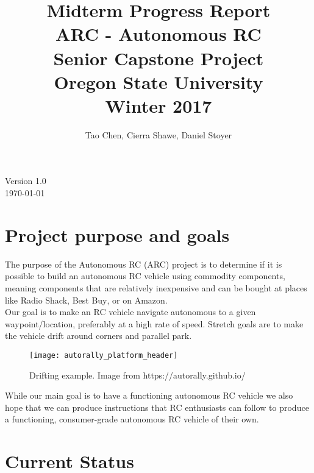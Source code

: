 \documentclass[compsoc,draftclsnofoot,onecolumn,10pt]{IEEEtran}
\date{}
\begin{document}
\begin{titlepage}
\title{
Midterm Progress Report\\
\LARGE
ARC - Autonomous RC\\
Senior Capstone Project\\
Oregon State University\\
Winter 2017
}
\author{Tao Chen, Cierra Shawe, Daniel Stoyer}
\maketitle
\begin{center}
	Version 1.0\\
	\today
\end{center}

\thispagestyle{empty} %
	
\end{titlepage}

\tableofcontents

\newpage

\section{Project purpose and goals} 
The purpose of the Autonomous RC (ARC) project is to determine if it is possible
to build an autonomous RC vehicle using commodity components, meaning components
that are relatively inexpensive and can be bought at places like Radio
Shack\textsuperscript{\textregistered}, Best Buy\textsuperscript{\textregistered}, or on Amazon. \\
Our goal is to make an RC vehicle navigate autonomous to a given
waypoint/location, preferably at a high rate of speed. Stretch goals are to
make the vehicle drift around corners and parallel park.\\

\begin{figure}[H]
   	\texttt{[image: autorally\_platform\_header]}
    \caption{Drifting example. Image from https://autorally.github.io/}
\end{figure}

While our main goal is to have a functioning autonomous RC vehicle we also hope
that we can produce instructions that RC enthusiasts can follow to produce a
functioning, consumer-grade autonomous RC vehicle of their own.

\section{Current Status}
\end{document}
